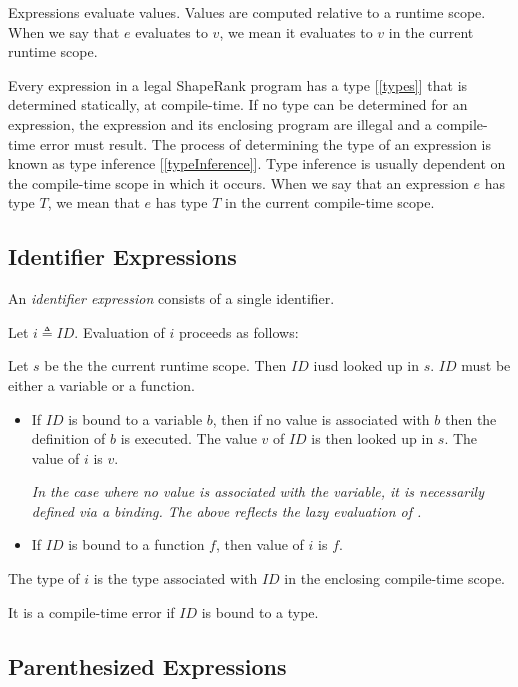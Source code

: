 \documentclass{article}
\begin{document}
Expressions evaluate values. Values are computed relative to a runtime scope. When we say that $e$ evaluates to $v$, we mean it evaluates to $v$ in the current runtime scope. 

Every expression in a legal ShapeRank program has a type [\ref{types}] that is determined statically, at compile-time. If no type can be determined for an expression, the expression and its enclosing program are illegal and a compile-time error must result. The process of determining the type of an expression is known as type inference [\ref{typeInference}]. Type inference  is usually dependent on the compile-time scope in which it occurs. When we say that an expression $e$ has type $T$, we mean that $e$ has type $T$ in the current compile-time scope.

\subsection{Identifier Expressions}
\label{identifierExpressions}

An {\em identifier expression} consists of a single identifier.

\IdentifierExpression{}

Let $i \triangleq ID$.
Evaluation of $i$ proceeds as follows:


Let $s$ be the the current runtime scope. Then $ID$ iusd looked up in $s$. $ID$ must be either a variable or a function.
\begin{itemize}
\item If $ID$ is bound to a variable $b$, then if no value is associated with $b$ then the definition of $b$ is executed. The value $v$ of $ID$ is then looked up in $s$. The value of $i$ is $v$.

{\em In the case where no value is associated with the variable, it is necessarily defined via  a \LET{} binding. The above reflects the lazy evaluation of \LET{}.}

\item If $ID$ is bound to a function $f$, then value of $i$ is $f$. 
\end{itemize}

The type of $i$ is the type associated with $ID$ in the enclosing compile-time scope.

It is a compile-time error if $ID$ is bound to a type. 


\subsection{Parenthesized Expressions}
\label{parenthesizedExpressions}
\end{document}
